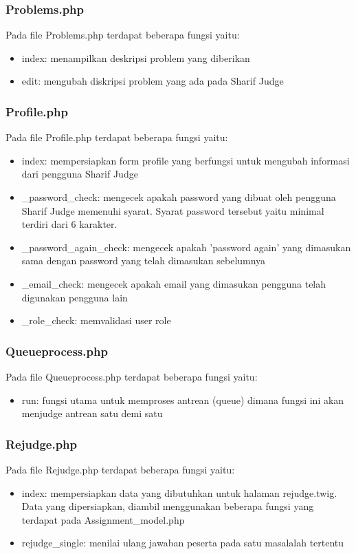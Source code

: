 \subsubsection{Problems.php}
Pada file Problems.php terdapat beberapa fungsi yaitu:
\begin{itemize}
	\item index: menampilkan deskripsi problem yang diberikan
	\item edit: mengubah diskripsi problem yang ada pada Sharif Judge
\end{itemize}

\subsubsection{Profile.php}
Pada file Profile.php terdapat beberapa fungsi yaitu:
\begin{itemize}
	\item index: mempersiapkan form profile yang berfungsi untuk mengubah informasi dari pengguna Sharif Judge
	\item \_password\_check: mengecek apakah password yang dibuat oleh pengguna Sharif Judge memenuhi syarat. Syarat password tersebut yaitu minimal terdiri dari 6 karakter.
	\item \_password\_again\_check: mengecek apakah 'password again' yang dimasukan sama dengan password yang telah dimasukan sebelumnya
	\item \_email\_check: mengecek apakah email yang dimasukan pengguna telah digunakan pengguna lain
	\item \_role\_check: memvalidasi user role
\end{itemize}

\subsubsection{Queueprocess.php}
Pada file Queueprocess.php terdapat beberapa fungsi yaitu:
\begin{itemize}
	\item run: fungsi utama untuk memproses antrean (queue) dimana fungsi ini akan menjudge antrean satu demi satu
\end{itemize}

\subsubsection{Rejudge.php}
Pada file Rejudge.php terdapat beberapa fungsi yaitu:
\begin{itemize}
	\item index: mempersiapkan data yang dibutuhkan untuk halaman rejudge.twig. Data yang dipersiapkan, diambil menggunakan beberapa fungsi yang terdapat pada Assignment\_model.php
	\item rejudge\_single: menilai ulang jawaban peserta pada satu masalalah tertentu
\end{itemize}

